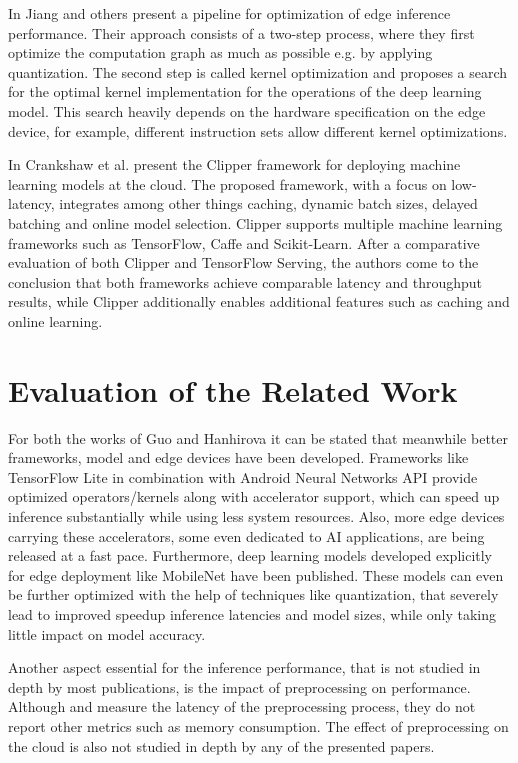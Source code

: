 In \cite{jiang2018efficient} Jiang and others present a pipeline for optimization of edge inference performance.
Their approach consists of a two-step process, where they first optimize the computation graph as much as possible e.g. by applying quantization.
The second step is called kernel optimization and proposes a search for the optimal kernel implementation for the operations of the deep learning model.
This search heavily depends on the hardware specification on the edge device, for example, different instruction sets allow different kernel optimizations.

In \cite{201468} Crankshaw et al. present the Clipper framework for deploying machine learning models at the cloud.
The proposed framework, with a focus on low-latency, integrates among other things caching, dynamic batch sizes, delayed batching and online model selection.
Clipper supports multiple machine learning frameworks such as TensorFlow, Caffe and Scikit-Learn.
After a comparative evaluation of both Clipper and TensorFlow Serving, the authors come to the conclusion that both frameworks achieve comparable latency and throughput results, while Clipper additionally enables additional features such as caching and online learning.

\section{Evaluation of the Related Work}
For both the works of Guo\cite{DBLP:conf/ic2e/Guo18} and Hanhirova\cite{DBLP:conf/mmsys/HanhirovaKSSHY18} it can be stated that meanwhile better frameworks, model and edge devices have been developed.
Frameworks like TensorFlow Lite in combination with Android Neural Networks API provide optimized operators/kernels along with accelerator support, which can speed up inference substantially while using less system resources.
Also, more edge devices carrying these accelerators, some even dedicated to AI applications, are being released at a fast pace.
Furthermore, deep learning models developed explicitly for edge deployment like MobileNet have been published. These models can even be further optimized with the help of techniques like quantization, that severely lead to improved speedup inference latencies and model sizes, while only taking little impact on model accuracy.

Another aspect essential for the inference performance, that is not studied in depth by most publications, is the impact of preprocessing on performance.
Although \cite{DBLP:conf/ic2e/Guo18} and \cite{DBLP:conf/mmsys/HanhirovaKSSHY18} measure the latency of the preprocessing process, they do not report other metrics such as memory consumption. The effect of preprocessing on the cloud is also not studied in depth by any of the presented papers.


